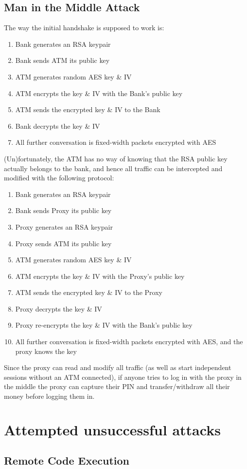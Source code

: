 \documentclass[12pt]{article}
\begin{document}
\subsection*{Man in the Middle Attack}
The way the initial handshake is supposed to work is:
\begin{enumerate}[1)]
\item Bank generates an RSA keypair
\item Bank sends ATM its public key
\item ATM generates random AES key \& IV
\item ATM encrypts the key \& IV with the Bank's public key
\item ATM sends the encrypted key \& IV to the Bank
\item Bank decrypts the key \& IV
\item All further conversation is fixed-width packets encrypted with AES
\end{enumerate}
(Un)fortunately, the ATM has no way of knowing that the RSA public key actually belongs to the bank, and hence all traffic can be intercepted and modified with the following protocol:
\begin{enumerate}[1)]
\item Bank generates an RSA keypair
\item Bank sends Proxy its public key
\item Proxy generates an RSA keypair
\item Proxy sends ATM its public key
\item ATM generates random AES key \& IV
\item ATM encrypts the key \& IV with the Proxy's public key
\item ATM sends the encrypted key \& IV to the Proxy
\item Proxy decrypts the key \& IV
\item Proxy re-encrypts the key \& IV with the Bank's public key
\item All further conversation is fixed-width packets encrypted with AES, and the proxy knows the key
\end{enumerate}
Since the proxy can read and modify all traffic (as well as start independent sessions without an ATM connected), if anyone tries to log in with the proxy in the middle the proxy can capture their PIN and transfer/withdraw all their money before logging them in.
\section*{Attempted unsuccessful attacks}
\subsection*{Remote Code Execution}
\end{document}
